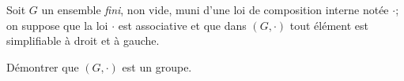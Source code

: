 Soit $G$ un ensemble \textit{fini}, non vide, muni d'une loi de composition interne notée $\cdot$; on suppose que la loi $\cdot$ est associative et que dans $(G,\cdot)$ tout élément est simplifiable
à droit et à gauche.

Démontrer que $(G,\cdot)$ est un groupe.